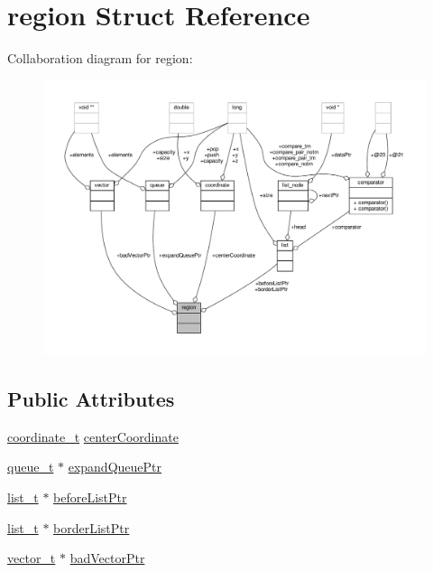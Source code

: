\hypertarget{structregion}{\section{region Struct Reference}
\label{structregion}
}


Collaboration diagram for region\-:
\nopagebreak
\begin{figure}[H]
\begin{center}
\leavevmode
\includegraphics[width=350pt]{structregion__coll__graph}
\end{center}
\end{figure}
\subsection*{Public Attributes}
\begin{DoxyCompactItemize}
\item 
\hyperlink{labyrinth_2coordinate_8h_ab8828f39e3b8bce05f072dc54206a25c}{coordinate\-\_\-t} \hyperlink{structregion_a223aa34627b18bcfb3f48cbd1be8452d}{center\-Coordinate}
\item 
\hyperlink{queue_8h_aa8acf648f3b0c69d7e132fcc61dc58c7}{queue\-\_\-t} $\ast$ \hyperlink{structregion_a477cd3e9eb118a028f0513bf90fb274f}{expand\-Queue\-Ptr}
\item 
\hyperlink{list_8h_af629e6a6713d7de11eab50cbe6449b06}{list\-\_\-t} $\ast$ \hyperlink{structregion_ab4e57c7cf6618d2c344e4515b1adb4b5}{before\-List\-Ptr}
\item 
\hyperlink{list_8h_af629e6a6713d7de11eab50cbe6449b06}{list\-\_\-t} $\ast$ \hyperlink{structregion_a49123f77284c0d931b2bedf3909294a6}{border\-List\-Ptr}
\item 
\hyperlink{vector_8h_a5a1bca6fa9a3f18a2897623094d918da}{vector\-\_\-t} $\ast$ \hyperlink{structregion_a90aa5790bd32ee48f5c3a95b6c32ea0a}{bad\-Vector\-Ptr}
\end{DoxyCompactItemize}


